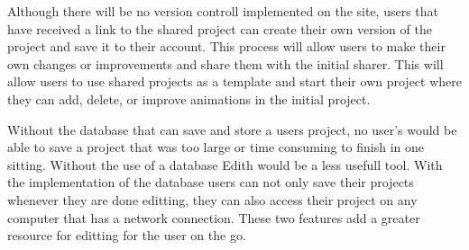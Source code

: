 \documentclass[12pt]{article}
\begin{document}
Although there will be no version controll implemented on the site, users that have received a link to the shared project can create their own version of the project and save it to their account. This process will allow users to make their own changes or improvements and share them with the initial sharer. This will allow users to use shared projects as a template and start their own project where they can add, delete, or improve animations in the initial project.

Without the database that can save and store a users project, no user's would be able to save a project that was too large or time consuming to finish in one sitting. Without the use of a database Edith would be a less usefull tool. With the implementation of the database users can not only save their projects whenever they are done editting, they can also access their project on any computer that has a network connection. These two features add a greater resource for editting for the user on the go.
\newpage
\end{document}
